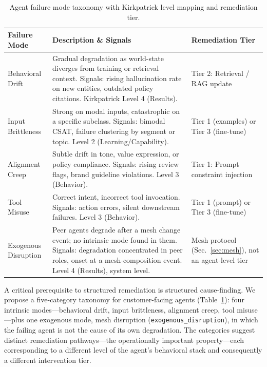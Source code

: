 \documentclass[conference]{IEEEtran}
\newcommand{\code}[1]{\texttt{\small #1}}
\begin{document}
\begin{table}[t]
\caption{Agent failure mode taxonomy with Kirkpatrick level mapping and
remediation tier.}
\label{tab:taxonomy}
\centering
\scriptsize
\begin{tabular}{@{}p{1.4cm}p{4.1cm}p{1.7cm}@{}}
\toprule
\textbf{Failure Mode} & \textbf{Description \& Signals} & \textbf{Remediation
Tier} \\
\midrule
Behavioral Drift &
Gradual degradation as world-state diverges from training or retrieval context.
Signals: rising hallucination rate on new entities, outdated policy citations.
Kirkpatrick Level 4 (Results). &
Tier 2: Retrieval / RAG update \\
\addlinespace
Input Brittleness &
Strong on modal inputs, catastrophic on a specific subclass. Signals: bimodal
CSAT, failure clustering by segment or topic. Level 2 (Learning/Capability). &
Tier 1 (examples) or Tier 3 (fine-tune) \\
\addlinespace
Alignment Creep &
Subtle drift in tone, value expression, or policy compliance. Signals: rising
review flags, brand guideline violations. Level 3 (Behavior). &
Tier 1: Prompt constraint injection \\
\addlinespace
Tool Misuse &
Correct intent, incorrect tool invocation. Signals: action errors, silent
downstream failures. Level 3 (Behavior). &
Tier 1 (prompt) or Tier 3 (fine-tune) \\
\addlinespace
Exogenous Disruption &
Peer agents degrade after a mesh change event; no intrinsic mode found in them.
Signals: degradation concentrated in peer roles, onset at a mesh-composition
event. Level 4 (Results), system level. &
Mesh protocol (Sec.~\ref{sec:mesh}), not an agent-level tier \\
\bottomrule
\end{tabular}
\end{table}

A critical prerequisite to structured remediation is structured cause-finding.
We propose a five-category taxonomy for customer-facing agents
(Table~\ref{tab:taxonomy}): four intrinsic modes---behavioral drift, input
brittleness, alignment creep, tool misuse---plus one exogenous mode, mesh
disruption (\code{exogenous\_disruption}), in which the failing agent is not
the cause of its own degradation. The categories suggest distinct remediation
pathways---the operationally important property---each corresponding to a
different level of the agent's behavioral stack and consequently a different
intervention tier.
\end{document}
